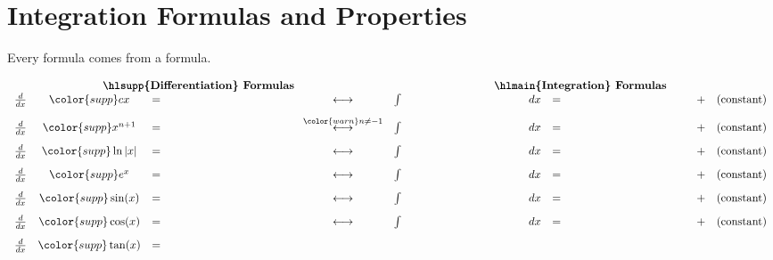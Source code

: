 \documentclass[../main.tex]{subfiles}
\begin{document}
 \section{Integration Formulas and Properties} \label{lession:integration-formulas}
  Every  formula comes from a  formula.

  \[
    \begin{array}{rcclcrclllcl} 
      \multicolumn{5}{c}{\text{\textbf{\hlsupp{Differentiation} Formulas}}} & \multicolumn{7}{c}{\text{\textbf{\hlmain{Integration} Formulas}}} \\
      \frac{d}{dx} & {\color{supp} cx} &=& \phantom{\color{main} c}
                   & \longleftrightarrow 
                   & \int & \phantom{\color{main} c} & dx &=& \phantom{\color{supp} cx} 
                   &+& (\text{constant}) \\[2ex]
      \frac{d}{dx} & {\color{supp} x^{n+1}  } &=& \phantom{\color{main} (n+1) x^{n}}
                   & \overset{\color{warn} n \ne -1}{\longleftrightarrow}
                   & \int & \phantom{\color{main} x^{n}} & dx &=& \phantom{\color{supp} \frac{x^{n+1}}{n+1} } 
                   &+& (\text{constant}) \\[2ex]
      \frac{d}{dx} & {\color{supp} \ln|x| } &=& \phantom{\color{main} x^{-1}}
                   & \longleftrightarrow 
                   & \int & \phantom{\color{main} x^{-1}} & dx &=& \phantom{\color{supp} \ln|x|} 
                   &+& (\text{constant}) \\[2ex]
      \frac{d}{dx} & {\color{supp} e^{x}} &=& \phantom{\color{main} e^{x}}
                   & \longleftrightarrow
                   & \int & \phantom{\color{main} e^{x}      } & dx &=& \phantom{\color{supp} e^{x}} 
                   &+& (\text{constant}) \\[2ex]
      \frac{d}{dx} & {\color{supp} \sin(x)} &=& \phantom{\color{main} \cos(x)}
                   & \longleftrightarrow 
                   & \int & \phantom{\color{main} \cos(x)} & dx &=& \phantom{\color{supp} \sin(x)} 
                   &+& (\text{constant}) \\[2ex]
      \frac{d}{dx} & {\color{supp} \cos(x)} &=& \phantom{\color{main} -\sin(x)}
                   & \longleftrightarrow 
                   & \int & \phantom{\color{main} \sin(x)} & dx &=& \phantom{\color{supp} -\cos(x)} 
                   &+& (\text{constant}) \\[2ex]
      \frac{d}{dx} & {\color{supp} \tan(x)} &=& \phantom{\color{main} \sec^{2}(x)}

\end{array}\]
\end{document}
